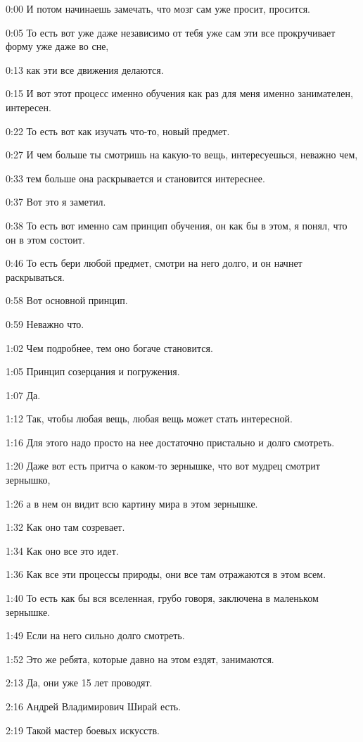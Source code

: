 0:00
И потом начинаешь замечать, что мозг сам уже просит, просится.

0:05
То есть вот уже даже независимо от тебя уже сам эти все прокручивает форму уже даже во сне,

0:13
как эти все движения делаются.

0:15
И вот этот процесс именно обучения как раз для меня именно занимателен, интересен.

0:22
То есть вот как изучать что-то, новый предмет.

0:27
И чем больше ты смотришь на какую-то вещь, интересуешься, неважно чем,

0:33
тем больше она раскрывается и становится интереснее.

0:37
Вот это я заметил.

0:38
То есть вот именно сам принцип обучения, он как бы в этом, я понял, что он в этом состоит.

0:46
То есть бери любой предмет, смотри на него долго, и он начнет раскрываться.

0:58
Вот основной принцип.

0:59
Неважно что.

1:02
Чем подробнее, тем оно богаче становится.

1:05
Принцип созерцания и погружения.

1:07
Да.

1:12
Так, чтобы любая вещь, любая вещь может стать интересной.

1:16
Для этого надо просто на нее достаточно пристально и долго смотреть.

1:20
Даже вот есть притча о каком-то зернышке, что вот мудрец смотрит зернышко,

1:26
а в нем он видит всю картину мира в этом зернышке.

1:32
Как оно там созревает.

1:34
Как оно все это идет.

1:36
Как все эти процессы природы, они все там отражаются в этом всем.

1:40
То есть как бы вся вселенная, грубо говоря, заключена в маленьком зернышке.

1:49
Если на него сильно долго смотреть.

1:52
Это же ребята, которые давно на этом ездят, занимаются.

2:13
Да, они уже 15 лет проводят.

2:16
Андрей Владимирович Ширай есть.

2:19
Такой мастер боевых искусств.


